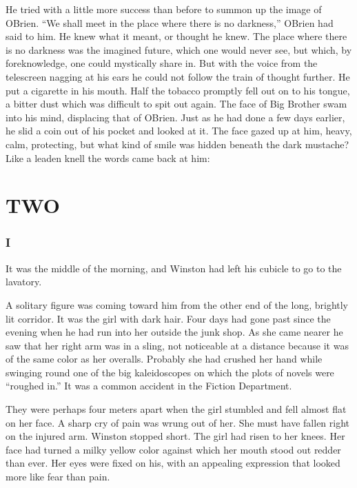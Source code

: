 He tried with a little more success than before to summon up the image
of O\textquotesingle Brien. ``We shall meet in the place where there is
no darkness,'' O\textquotesingle Brien had said to him. He knew what it
meant, or thought he knew. The place where there is no darkness was the
imagined future, which one would never see, but which, by foreknowledge,
one could mystically share in. But with the voice from the telescreen
nagging at his ears he could not follow the train of thought further. He
put a cigarette in his mouth. Half the tobacco promptly fell out on to
his tongue, a bitter dust which was difficult to spit out again. The
face of Big Brother swam into his mind, displacing that of
O\textquotesingle Brien. Just as he had done a few days earlier, he slid
a coin out of his pocket and looked at it. The face gazed up at him,
heavy, calm, protecting, but what kind of smile was hidden beneath the
dark mustache? Like a leaden knell the words came back at him:



\clearpage
\part{TWO}\label{two}

\section{I}

It was the middle of the morning, and Winston had left his cubicle to go
to the lavatory.

A solitary figure was coming toward him from the other end of the long,
brightly lit corridor. It was the girl with dark hair. Four days had
gone past since the evening when he had run into her outside the junk
shop. As she came nearer he saw that her right arm was in a sling, not
noticeable at a distance because it was of the same color as her
overalls. Probably she had crushed her hand while swinging round one of
the big kaleidoscopes on which the plots of novels were ``roughed in.'' It
was a common accident in the Fiction Department.

They were perhaps four meters apart when the girl stumbled and fell
almost flat on her face. A sharp cry of pain was wrung out of her. She
must have fallen right on the injured arm. Winston stopped short. The
girl had risen to her knees. Her face had turned a milky yellow color
against which her mouth stood out redder than ever. Her eyes were fixed
on his, with an appealing expression that looked more like fear than
pain.

